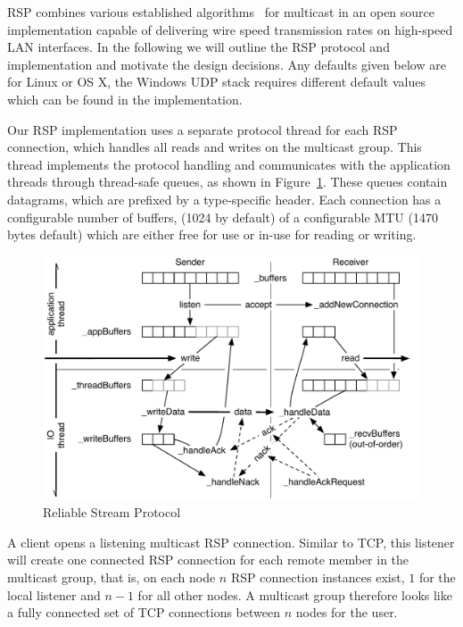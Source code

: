 \documentclass[10pt,journal,compsoc]{IEEEtran}
\newcommand{\fig}[1]{Figure~\ref{#1}}
\begin{document}
RSP combines various established algorithms~\cite{adamson2004negative,
  Gau:2002:MFC:506824.506832} for multicast in an open source implementation
capable of delivering wire speed transmission rates on high-speed LAN
interfaces. In the following we will outline the RSP protocol and implementation
and motivate the design decisions. Any defaults given below are for Linux or OS
X, the Windows UDP stack requires different default values which can be found in
the implementation.

Our RSP implementation uses a separate protocol thread for each RSP connection,
which handles all reads and writes on the multicast group. This thread
implements the protocol handling and communicates with the application threads
through thread-safe queues, as shown in \fig{fRSPProto}. These queues contain
datagrams, which are prefixed by a type-specific header. Each connection has a
configurable number of buffers, (1024 by default) of a configurable MTU (1470
bytes default) which are either free for use or in-use for reading or writing.




\begin{figure}[ht]\center
  \includegraphics[width=\columnwidth]{images/rspPackets}
  \caption{\label{fRSPProto}Reliable Stream Protocol}
\end{figure}

A client opens a listening multicast RSP connection. Similar to TCP, this
listener will create one connected RSP connection for each remote member in the
multicast group, that is, on each node $n$ RSP connection instances exist, $1$
for the local listener and $n-1$ for all other nodes. A multicast group
therefore looks like a fully connected set of TCP connections between $n$ nodes
for the user.
\end{document}
